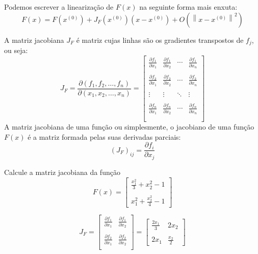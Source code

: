 Podemos escrever a linearização de $F(x)$ na seguinte forma mais enxuta:
$$F(x)=F\left(x^{(0)}\right)+ J_F(x^{(0)})\left(x-x^{(0)}\right) + O\left(\left\|x-x^{(0)}\right\|^2\right) $$

A matriz jacobiana $J_F$ é matriz cujas linhas são os gradientes transpostos de $f_j$, ou seja:
$$J_F= \frac{\partial(f_1,f_2,\ldots,f_n)}{\partial(x_1,x_2,\ldots,x_n)}=\left[
\begin{array}{ccccc}
\frac{\partial f_1}{\partial x_1}&\frac{\partial f_1}{\partial x_2}&\cdots&\frac{\partial f_1}{\partial x_n}\\~\\
\frac{\partial f_2}{\partial x_1}&\frac{\partial f_2}{\partial x_2}&\cdots&\frac{\partial f_2}{\partial x_n}\\~\\
\vdots&\vdots&\ddots&\vdots\\~\\
\frac{\partial f_n}{\partial x_1}&\frac{\partial f_n}{\partial x_2}&\cdots&\frac{\partial f_n}{\partial x_n}\\~\\
\end{array}
\right]
$$
A matriz jacobiana de uma função ou simplesmente, o jacobiano de uma função $F(x)$ é a matriz formada pelas suas derivadas parciais:
$$\left(J_F\right)_{ij}=\frac{\partial f_i}{\partial x_j}$$


\begin{ex} Calcule a matriz jacobiana da função
$$F(x)=\left[
\begin{array}{c}
\frac{x_1^2}{3}+x_2^2-1\\~\\
x_1^2+\frac{x_2^2}{4}-1
\end{array}
\right]$$

$$J_F=\left[
\begin{array}{cc}
\frac{\partial f_1}{\partial x_1} & \frac{\partial f_1}{\partial x_2}\\~\\
\frac{\partial f_2}{\partial x_1} & \frac{\partial f_2}{\partial x_2}\\
\end{array}
\right]=\left[
\begin{array}{cc}
\frac{2x_1}{3} & 2x_2\\~\\
2x_1&\frac{x_2}{2}
\end{array}
\right]
$$
\end{ex}

% 
